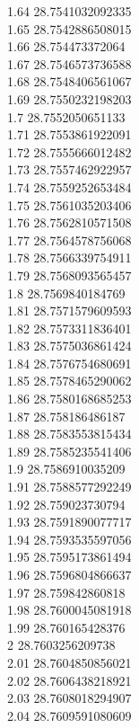 {1.64	28.7541032092335\\
1.65	28.7542886508015\\
1.66	28.754473372064\\
1.67	28.7546573736588\\
1.68	28.7548406561067\\
1.69	28.7550232198203\\
1.7	28.7552050651133\\
1.71	28.7553861922091\\
1.72	28.7555666012482\\
1.73	28.7557462922957\\
1.74	28.7559252653484\\
1.75	28.7561035203406\\
1.76	28.7562810571508\\
1.77	28.7564578756068\\
1.78	28.7566339754911\\
1.79	28.7568093565457\\
1.8	28.7569840184769\\
1.81	28.7571579609593\\
1.82	28.7573311836401\\
1.83	28.7575036861424\\
1.84	28.7576754680691\\
1.85	28.7578465290062\\
1.86	28.7580168685253\\
1.87	28.758186486187\\
1.88	28.7583553815434\\
1.89	28.7585235541406\\
1.9	28.7586910035209\\
1.91	28.7588577292249\\
1.92	28.759023730794\\
1.93	28.7591890077717\\
1.94	28.7593535597056\\
1.95	28.7595173861494\\
1.96	28.7596804866637\\
1.97	28.759842860818\\
1.98	28.7600045081918\\
1.99	28.760165428376\\
2	28.7603256209738\\
2.01	28.7604850856021\\
2.02	28.7606438218921\\
2.03	28.7608018294907\\
2.04	28.7609591080609\\
}
